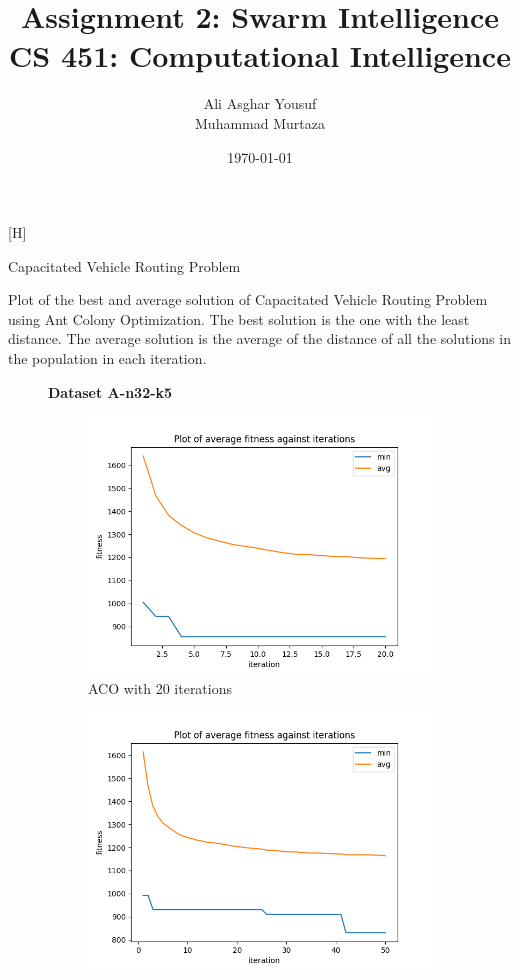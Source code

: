\documentclass[a4paper]{exam}
\title{Assignment 2: Swarm Intelligence\\CS 451: Computational Intelligence}
\author{Ali Asghar Yousuf\\Muhammad Murtaza}  %
\date{\today}
\begin{document}
\maketitle

\begin{questions}

  [H]

  \begin{center}
  \large
  Capacitated Vehicle Routing Problem
  \end{center}

  \normalsize
  Plot of the best and average solution of Capacitated Vehicle Routing Problem using Ant Colony Optimization. The best solution is the one with the least distance. The average solution is the average of the distance of all the solutions in the population in each iteration.
  \begin{figure}[H]
    \centering
    \textbf{Dataset A-n32-k5}
    \begin{subfigure}{.5\textwidth}
      \centering
      \includegraphics[width=1\linewidth]{images/n32-k5_20.png}
      \caption{ACO with 20 iterations}
      \label{fig:n32-k5_20}
    \end{subfigure}%
    \begin{subfigure}{.5\textwidth}
      \centering
      \includegraphics[width=1\linewidth]{images/n32-k5_50.png}

\end{subfigure}
\end{figure}
\end{questions}
\end{document}
